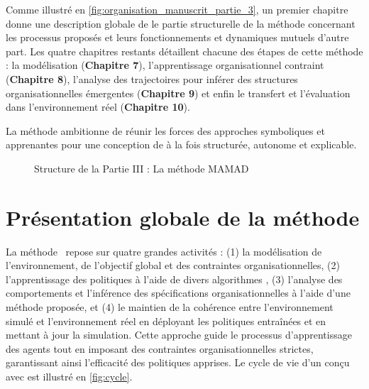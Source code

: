 \medskip

\noindent
Comme illustré en \autoref{fig:organisation_manuscrit_partie_3}, un premier chapitre donne une description globale de le partie structurelle de la méthode concernant les processus proposés et leurs fonctionnements et dynamiques mutuels d'autre part. Les quatre chapitres restants détaillent chacune des étapes de cette méthode :
la modélisation (\textbf{Chapitre 7}), l'apprentissage organisationnel contraint (\textbf{Chapitre 8}), l'analyse des trajectoires pour inférer des structures organisationnelles émergentes (\textbf{Chapitre 9}) et enfin le transfert et l'évaluation dans l'environnement réel (\textbf{Chapitre 10}).

La méthode  ambitionne de réunir les forces des approches symboliques et apprenantes pour une conception de  à la fois structurée, autonome et explicable.

\begin{figure}[h!]
    \centering
    \resizebox{\linewidth}{!}{%
        
    }
    \caption{Structure de la Partie III : La méthode MAMAD}
    \label{fig:organisation_manuscrit_partie_3}
\end{figure}



\chapter{Présentation globale de la méthode}
\label{sec:mamad}


La méthode ~\footnotemark[1] repose sur quatre grandes activités : (1) la modélisation de l'environnement, de l'objectif global et des contraintes organisationnelles, (2) l'apprentissage des politiques à l'aide de divers algorithmes , (3) l'analyse des comportements et l'inférence des spécifications organisationnelles à l'aide d'une méthode proposée, et (4) le maintien de la cohérence entre l'environnement simulé et l'environnement réel en déployant les politiques entraînées et en mettant à jour la simulation. Cette approche guide le processus d'apprentissage des agents tout en imposant des contraintes organisationnelles strictes, garantissant ainsi l'efficacité des politiques apprises. Le cycle de vie d'un  conçu avec  est illustré en \autoref{fig:cycle}.

